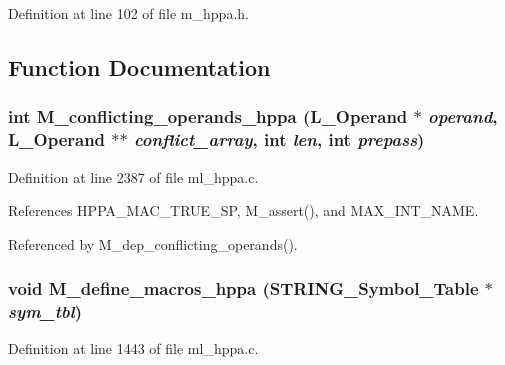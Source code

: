 Definition at line 102 of file m\_\-hppa.h.

\subsection{Function Documentation}
\subsubsection{\setlength{\rightskip}{0pt plus 5cm}int M\_\-conflicting\_\-operands\_\-hppa (L\_\-Operand $\ast$ {\em operand}, L\_\-Operand $\ast$$\ast$ {\em conflict\_\-array}, int {\em len}, int {\em prepass})}\label{m__hppa_8h_859e41c807ea451447492d5c5ea0ad20}




Definition at line 2387 of file ml\_\-hppa.c.

References HPPA\_\-MAC\_\-TRUE\_\-SP, M\_\-assert(), and MAX\_\-INT\_\-NAME.

Referenced by M\_\-dep\_\-conflicting\_\-operands().
\subsubsection{\setlength{\rightskip}{0pt plus 5cm}void M\_\-define\_\-macros\_\-hppa (\bf{STRING\_\-Symbol\_\-Table} $\ast$ {\em sym\_\-tbl})}\label{m__hppa_8h_3c7cde3308152f998e523078246208c6}




Definition at line 1443 of file ml\_\-hppa.c.

